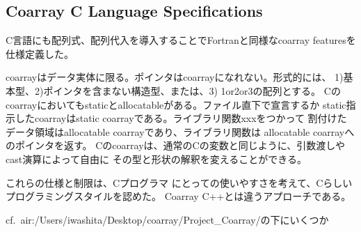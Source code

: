 \subsection{Coarray C Language Specifications}

C言語にも配列式、配列代入を導入することでFortranと同様なcoarray featuresを仕様定義した。

coarrayはデータ実体に限る。ポインタはcoarrayになれない。形式的には、
1)基本型、2)ポインタを含まない構造型、または、3) 1or2or3の配列とする。
Cのcoarrayにおいてもstaticとallocatableがある。ファイル直下で宣言するか
static指示したcoarrayはstatic coarrayである。ライブラリ関数xxxをつかって
割付けたデータ領域はallocatable coarrayであり、ライブラリ関数は
allocatable coarrayへのポインタを返す。
Cのcoarrayは、通常のCの変数と同じように、引数渡しやcast演算によって自由に
その型と形状の解釈を変えることができる。

これらの仕様と制限は、Cプログラマ
にとっての使いやすさを考えて、Cらしいプログラミングスタイルを認めた。
Coarray C++とは違うアプローチである。

cf.\ air:/Users/iwashita/Desktop/coarray/Project\_Coarray/の下にいくつか
